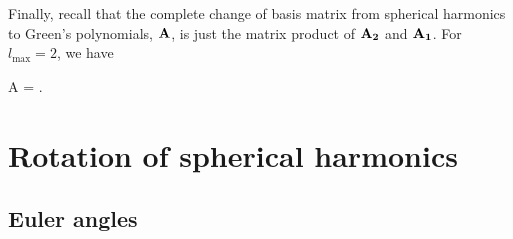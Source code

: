 \documentclass[modern]{aastex61}
\begin{document}
Finally, recall that the complete change of basis matrix from spherical
harmonics to Green's polynomials, ${\mathbf{A}}$, is just the matrix product
of ${\mathbf{A_2}}$ and ${\mathbf{A_1}}$. For $l_\mathrm{max} = 2$, we have
%
\begin{proof*}{A}
     =
        \quad.
\end{proof*}
%

\vspace*{4em}
\section{Rotation of spherical harmonics}
\label{app:rotation}

\subsection{Euler angles}
\label{app:euler}
\end{document}
